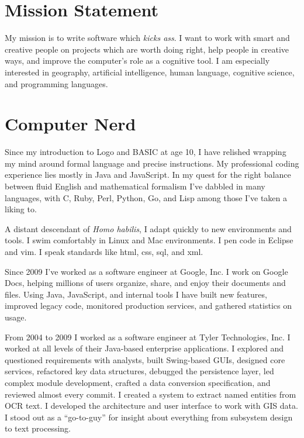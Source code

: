 \section*{Mission Statement}
My mission is to write software which \emph{kicks ass}.  I want to work with
smart and creative people on projects which are worth doing right, help people
in creative ways, and improve the computer's role as a cognitive tool.  I am
especially interested in geography, artificial intelligence, human language,
cognitive science, and programming languages.
\section*{Computer Nerd}
  \begin{compactitem}
    \item 
    Since my introduction to Logo and BASIC at age 10, I have relished wrapping
my mind around formal language and precise instructions.  My professional coding
experience lies mostly in Java and JavaScript. In my quest for the right
balance between fluid English and mathematical formalism I've dabbled in many
languages, with C, Ruby, Perl, Python, Go, and Lisp among those I've taken a
liking to.
    \item 
    A distant descendant of \emph{Homo habilis}, I adapt quickly to new
environments and tools. I swim comfortably in Linux and Mac environments. I pen
code in Eclipse and vim. I speak standards like html, css, sql, and xml.
    \item
    Since 2009 I've worked as a software engineer at Google, Inc.  I work on
Google Docs, helping millions of users organize, share, and enjoy their
documents and files. Using Java, JavaScript, and internal tools I have built
new features, improved legacy code, monitored production services, and gathered
statistics on usage.
    \item 
    From 2004 to 2009 I worked as a software engineer at Tyler Technologies, Inc.
I worked at all levels of their Java-based enterprise applications.  I explored
and questioned requirements with analysts, built Swing-based GUIs, designed core
services, refactored key data structures, debugged the persistence layer, led
complex module development, crafted a data conversion specification, and
reviewed almost every commit. I created a system to
extract named entities from OCR text. I developed the architecture and user
interface to work with GIS data. I stood out as a ``go-to-guy'' for insight
about everything from subsystem design to text processing.

\end{compactitem}
